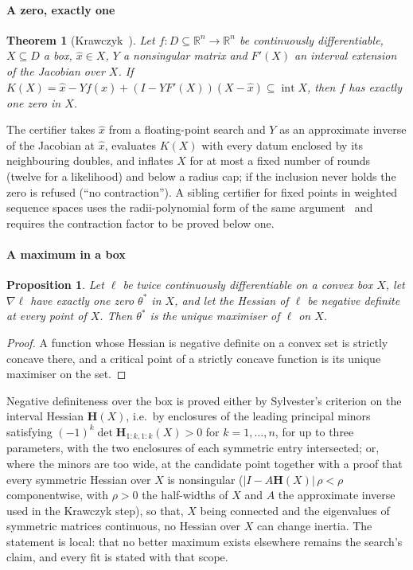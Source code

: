 \documentclass[preprint,11pt,a4paper]{elsarticle}
\newtheorem{theorem}{Theorem}
\newtheorem{proposition}{Proposition}
\theoremstyle{definition}
\newcommand{\R}{\mathbb{R}}
\begin{document}
\paragraph{A zero, exactly one}
\begin{theorem}[Krawczyk~\citep{Krawczyk69,Neumaier90,Rump10}]\label{thm:krawczyk}
Let $f:D\subseteq\R^n\to\R^n$ be continuously differentiable, $X\subseteq D$ a box, $\hat x\in X$, $Y$ a nonsingular matrix and $F'(X)$ an interval extension of the Jacobian over $X$. If $K(X)=\hat x-Yf(\hat x)+(I-YF'(X))(X-\hat x)\subseteq\operatorname{int}X$, then $f$ has exactly one zero in $X$.
\end{theorem}
The certifier takes $\hat x$ from a floating-point search and $Y$ as an approximate inverse of the Jacobian at $\hat x$, evaluates $K(X)$ with every datum enclosed by its neighbouring doubles, and inflates $X$ for at most a fixed number of rounds (twelve for a likelihood) and below a radius cap; if the inclusion never holds the zero is refused (``no contraction''). A sibling certifier for fixed points in weighted sequence spaces uses the radii-polynomial form of the same argument~\citep{vandenBergLessard15} and requires the contraction factor to be proved below one.

\paragraph{A maximum in a box}
\begin{proposition}\label{prop:max}
Let $\ell$ be twice continuously differentiable on a convex box $X$, let $\nabla\ell$ have exactly one zero $\theta^*$ in $X$, and let the Hessian of $\ell$ be negative definite at every point of $X$. Then $\theta^*$ is the unique maximiser of $\ell$ on $X$.
\end{proposition}
\begin{proof}
A function whose Hessian is negative definite on a convex set is strictly concave there, and a critical point of a strictly concave function is its unique maximiser on the set.
\end{proof}
Negative definiteness over the box is proved either by Sylvester's criterion on the interval Hessian $\mathbf{H}(X)$, i.e.\ by enclosures of the leading principal minors satisfying $(-1)^k\det\mathbf{H}_{1:k,1:k}(X)>0$ for $k=1,\dots,n$, for up to three parameters, with the two enclosures of each symmetric entry intersected; or, where the minors are too wide, at the candidate point together with a proof that every symmetric Hessian over $X$ is nonsingular ($|I-A\mathbf{H}(X)|\,\rho<\rho$ componentwise, with $\rho>0$ the half-widths of $X$ and $A$ the approximate inverse used in the Krawczyk step), so that, $X$ being connected and the eigenvalues of symmetric matrices continuous, no Hessian over $X$ can change inertia. The statement is local: that no better maximum exists elsewhere remains the search's claim, and every fit is stated with that scope.
\end{document}
